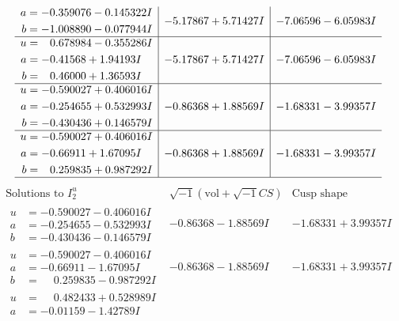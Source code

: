\documentclass[1p]{elsarticle_modified}
\theoremstyle{definition}
\newcommand{\I}{\sqrt{-1}}
\begin{document}
$$\begin{array}{c|c|c}
\begin{aligned}
a &= -0.359076 - 0.145322 I \\
b &= -1.008890 - 0.077944 I\end{aligned}
 & -5.17867 + 5.71427 I & -7.06596 - 6.05983 I \\ \hline\begin{aligned}
u &= \phantom{-}0.678984 - 0.355286 I \\
a &= -0.41568 + 1.94193 I \\
b &= \phantom{-}0.46000 + 1.36593 I\end{aligned}
 & -5.17867 + 5.71427 I & -7.06596 - 6.05983 I \\ \hline\begin{aligned}
u &= -0.590027 + 0.406016 I \\
a &= -0.254655 + 0.532993 I \\
b &= -0.430436 + 0.146579 I\end{aligned}
 & -0.86368 + 1.88569 I & -1.68331 - 3.99357 I \\ \hline\begin{aligned}
u &= -0.590027 + 0.406016 I \\
a &= -0.66911 + 1.67095 I \\
b &= \phantom{-}0.259835 + 0.987292 I\end{aligned}
 & -0.86368 + 1.88569 I & -1.68331 - 3.99357 I\\
 \hline 
 \end{array}$$\newpage$$\begin{array}{c|c|c}  
\text{Solutions to }I^u_{2}& \I (\text{vol} + \sqrt{-1}CS) & \text{Cusp shape}\\
 \hline 
\begin{aligned}
u &= -0.590027 - 0.406016 I \\
a &= -0.254655 - 0.532993 I \\
b &= -0.430436 - 0.146579 I\end{aligned}
 & -0.86368 - 1.88569 I & -1.68331 + 3.99357 I \\ \hline\begin{aligned}
u &= -0.590027 - 0.406016 I \\
a &= -0.66911 - 1.67095 I \\
b &= \phantom{-}0.259835 - 0.987292 I\end{aligned}
 & -0.86368 - 1.88569 I & -1.68331 + 3.99357 I \\ \hline\begin{aligned}
u &= \phantom{-}0.482433 + 0.528989 I \\
a &= -0.01159 - 1.42789 I \\

\end{aligned}
\end{array}$$
\end{document}
